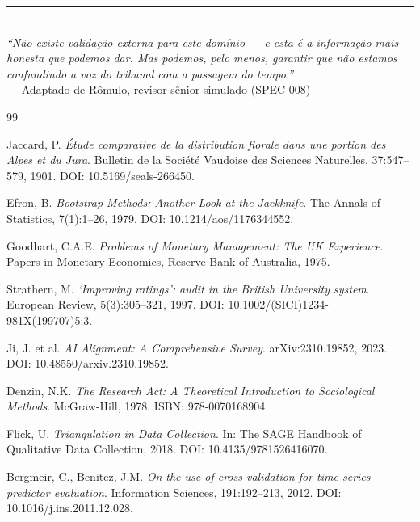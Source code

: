\documentclass[12pt,a4paper]{article}
\theoremstyle{remark}
\begin{document}
\vspace{16pt}

\begin{center}
\rule{0.5\textwidth}{0.4pt}\\[8pt]
\textit{``Não existe validação externa para este domínio — e esta é a informação mais honesta que podemos dar. Mas podemos, pelo menos, garantir que não estamos confundindo a voz do tribunal com a passagem do tempo.''}\\[8pt]
— Adaptado de Rômulo, revisor sênior simulado (SPEC-008)
\end{center}

\newpage

\begin{thebibliography}{99}

Jaccard, P. \textit{Étude comparative de la distribution florale dans une portion des Alpes et du Jura}. Bulletin de la Société Vaudoise des Sciences Naturelles, 37:547--579, 1901. DOI: 10.5169/seals-266450.

Efron, B. \textit{Bootstrap Methods: Another Look at the Jackknife}. The Annals of Statistics, 7(1):1--26, 1979. DOI: 10.1214/aos/1176344552.

Goodhart, C.A.E. \textit{Problems of Monetary Management: The UK Experience}. Papers in Monetary Economics, Reserve Bank of Australia, 1975.

Strathern, M. \textit{`Improving ratings': audit in the British University system}. European Review, 5(3):305--321, 1997. DOI: 10.1002/(SICI)1234-981X(199707)5:3.

Ji, J. et al. \textit{AI Alignment: A Comprehensive Survey}. arXiv:2310.19852, 2023. DOI: 10.48550/arxiv.2310.19852.

Denzin, N.K. \textit{The Research Act: A Theoretical Introduction to Sociological Methods}. McGraw-Hill, 1978. ISBN: 978-0070168904.

Flick, U. \textit{Triangulation in Data Collection}. In: The SAGE Handbook of Qualitative Data Collection, 2018. DOI: 10.4135/9781526416070.

Bergmeir, C., Benitez, J.M. \textit{On the use of cross-validation for time series predictor evaluation}. Information Sciences, 191:192--213, 2012. DOI: 10.1016/j.ins.2011.12.028.


\end{thebibliography}
\end{document}

